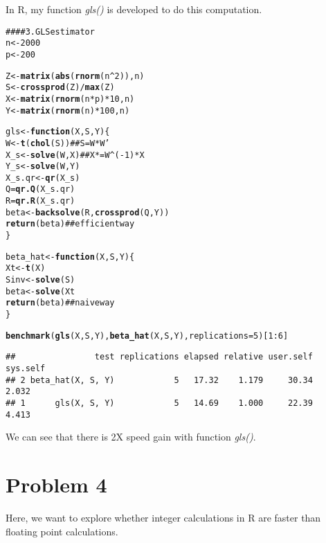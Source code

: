 \documentclass{article}\usepackage{graphicx, color}
\makeatletter
\newcommand{\hlfunctioncall}[1]{\textcolor[rgb]{0.501960784313725,0,0.329411764705882}{\textbf{#1}}}%
\newcommand{\hlcomment}[1]{\textcolor[rgb]{0.180392156862745,0.6,0.341176470588235}{#1}}%
\newenvironment{kframe}{%
 \def\at@end@of@kframe{}%
 \ifinner\ifhmode%
  \def\at@end@of@kframe{\end{minipage}}%
  \begin{minipage}{\columnwidth}%
 \fi\fi%
 \def\FrameCommand##1{\hskip\@totalleftmargin \hskip-\fboxsep
 \colorbox{shadecolor}{##1}\hskip-\fboxsep
     \hskip-\linewidth \hskip-\@totalleftmargin \hskip\columnwidth}%
 \MakeFramed {\advance\hsize-\width
   \@totalleftmargin\z@ \linewidth\hsize
   \@setminipage}}%
 {\par\unskip\endMakeFramed%
 \at@end@of@kframe}
\newenvironment{knitrout}{}{} %
\makeatother
\begin{document}
In R, my function \textit{gls()} is developed to do this computation.
\begin{knitrout}
\color{fgcolor}\begin{kframe}
\begin{alltt}
\hlcomment{#### 3. GLS estimator}
n <- 2000
p <- 200

Z <- \hlfunctioncall{matrix}(\hlfunctioncall{abs}(\hlfunctioncall{rnorm}(n^2)), n)
S <- \hlfunctioncall{crossprod}(Z)/\hlfunctioncall{max}(Z)
X <- \hlfunctioncall{matrix}(\hlfunctioncall{rnorm}(n * p) * 10, n)
Y <- \hlfunctioncall{matrix}(\hlfunctioncall{rnorm}(n) * 100, n)

gls <- \hlfunctioncall{function}(X, S, Y) \{
    W <- \hlfunctioncall{t}(\hlfunctioncall{chol}(S))  \hlcomment{## S = W * W'}
    X_s <- \hlfunctioncall{solve}(W, X)  \hlcomment{## X* = W^(-1) * X}
    Y_s <- \hlfunctioncall{solve}(W, Y)
    X_s.qr <- \hlfunctioncall{qr}(X_s)
    Q = \hlfunctioncall{qr.Q}(X_s.qr)
    R = \hlfunctioncall{qr.R}(X_s.qr)
    beta <- \hlfunctioncall{backsolve}(R, \hlfunctioncall{crossprod}(Q, Y))
    \hlfunctioncall{return}(beta)  \hlcomment{## efficient way}
\}

beta_hat <- \hlfunctioncall{function}(X, S, Y) \{
    Xt <- \hlfunctioncall{t}(X)
    Sinv <- \hlfunctioncall{solve}(S)
    beta <- \hlfunctioncall{solve}(Xt %*% Sinv %*% X) %*% Xt %*% Sinv %*% Y
    \hlfunctioncall{return}(beta)  \hlcomment{## naive way}
\}

\hlfunctioncall{benchmark}(\hlfunctioncall{gls}(X, S, Y), \hlfunctioncall{beta_hat}(X, S, Y), replications = 5)[1:6]
\end{alltt}
\newpage
\begin{verbatim}
##                test replications elapsed relative user.self sys.self
## 2 beta_hat(X, S, Y)            5   17.32    1.179     30.34    2.032
## 1      gls(X, S, Y)            5   14.69    1.000     22.39    4.413
\end{verbatim}
\end{kframe}
\end{knitrout}


We can see that there is 2X speed gain with function \textit{gls()}.

\newpage
\section*{Problem 4}
Here, we want to explore whether integer calculations in R are faster than
floating point calculations.
\end{document}
